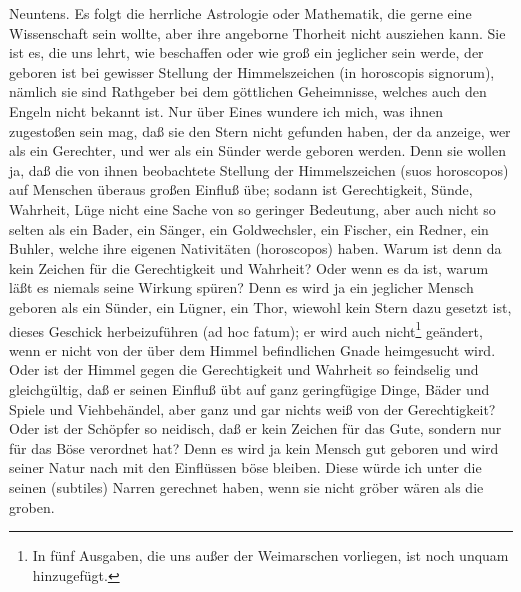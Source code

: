 Neuntens. Es folgt die herrliche Astrologie oder Mathematik, die gerne eine Wissenschaft sein wollte, aber ihre angeborne Thorheit nicht ausziehen kann. Sie ist es, die uns lehrt, wie beschaffen oder wie groß ein jeglicher sein werde, der geboren ist bei gewisser Stellung der Himmelszeichen (in horoscopis signorum), nämlich sie sind Rathgeber bei dem göttlichen Geheimnisse, welches auch den Engeln nicht bekannt ist. Nur über Eines wundere ich mich, was ihnen zugestoßen sein mag, daß sie den Stern nicht gefunden haben, der da anzeige, wer als ein Gerechter, und wer als ein Sünder werde geboren werden. Denn sie wollen ja, daß die von ihnen beobachtete Stellung der Himmelszeichen (suos horoscopos) auf Menschen überaus großen Einfluß übe; sodann ist Gerechtigkeit, Sünde, Wahrheit, Lüge nicht eine Sache von so geringer Bedeutung, aber auch nicht so selten als ein Bader, ein Sänger, ein Goldwechsler, ein Fischer, ein Redner, ein Buhler, welche ihre eigenen Nativitäten (horoscopos) haben. Warum ist denn da kein Zeichen für die Gerechtigkeit und Wahrheit? Oder wenn es da ist, warum läßt es niemals seine Wirkung spüren? Denn es wird ja ein jeglicher Mensch geboren als ein Sünder, ein Lügner, ein Thor, wiewohl kein Stern dazu gesetzt ist, dieses Geschick herbeizuführen (ad hoc fatum); er wird auch nicht\footnote{In fünf Ausgaben, die uns außer der Weimarschen vorliegen, ist noch unquam hinzugefügt.} geändert, wenn er nicht von der über dem Himmel befindlichen Gnade heimgesucht wird. Oder ist der Himmel gegen die Gerechtigkeit und Wahrheit so feindselig und gleichgültig, daß er seinen Einfluß übt auf ganz geringfügige Dinge, Bäder und Spiele und Viehbehändel, aber ganz und gar nichts weiß von der Gerechtigkeit? Oder ist der Schöpfer so neidisch, daß er kein Zeichen für das Gute, sondern nur für das Böse verordnet hat? Denn es wird ja kein Mensch gut geboren und wird seiner Natur nach mit den Einflüssen böse bleiben. Diese würde ich unter die seinen (subtiles) Narren gerechnet haben, wenn sie nicht gröber wären als die groben.

